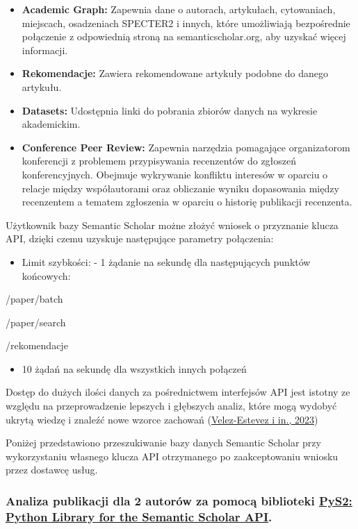 \documentclass[
  12pt,
]{article}
\providecommand{\tightlist}{%
  \setlength{\itemsep}{0pt}\setlength{\parskip}{0pt}}
\begin{document}
\begin{itemize}
\item
  \textbf{Academic Graph:} Zapewnia dane o autorach, artykułach,
  cytowaniach, miejscach, osadzeniach SPECTER2 i innych, które
  umożliwiają bezpośrednie połączenie z odpowiednią stroną na
  semanticscholar.org, aby uzyskać więcej informacji.
\item
  \textbf{Rekomendacje:} Zawiera rekomendowane artykuły podobne do
  danego artykułu.
\item
  \textbf{Datasets:} Udostępnia linki do pobrania zbiorów danych na
  wykresie akademickim.
\item
  \textbf{Conference Peer Review:} Zapewnia narzędzia pomagające
  organizatorom konferencji z problemem przypisywania recenzentów do
  zgłoszeń konferencyjnych. Obejmuje wykrywanie konfliktu interesów w
  oparciu o relacje między współautorami oraz obliczanie wyniku
  dopasowania między recenzentem a tematem zgłoszenia w oparciu o
  historię publikacji recenzenta.
\end{itemize}

Użytkownik bazy Semantic Scholar możne złożyć wniosek o przyznanie
klucza API, dzięki czemu uzyskuje następujące parametry połączenia:

\begin{itemize}
\tightlist
\item
  Limit szybkości: - 1 żądanie na sekundę dla następujących punktów
  końcowych:
\end{itemize}

/paper/batch

/paper/search

/rekomendacje

\begin{itemize}
\tightlist
\item
  10 żądań na sekundę dla wszystkich innych połączeń
\end{itemize}

Dostęp do dużych ilości danych za pośrednictwem interfejsów API jest
istotny ze względu na przeprowadzenie lepszych i głębszych analiz, które
mogą wydobyć ukrytą wiedzę i znaleźć nowe wzorce zachowań
(\protect\hyperlink{ref-velez-estevez2023}{Velez-Estevez i in., 2023})

Poniżej przedstawiono przeszukiwanie bazy danych Semantic Scholar przy
wykorzystaniu własnego klucza API otrzymanego po zaakceptowaniu wniosku
przez dostawcę usług.

\hypertarget{analiza-publikacji-dla-2-autoruxf3w-za-pomocux105-biblioteki-pys2-python-library-for-the-semantic-scholar-api.}{%
\subsubsection{\texorpdfstring{Analiza publikacji dla 2 autorów za
pomocą biblioteki \href{https://github.com/mirandrom/PyS2}{PyS2: Python
Library for the Semantic Scholar
API}.}{Analiza publikacji dla 2 autorów za pomocą biblioteki PyS2: Python Library for the Semantic Scholar API.}}\label{analiza-publikacji-dla-2-autoruxf3w-za-pomocux105-biblioteki-pys2-python-library-for-the-semantic-scholar-api.}}
\end{document}
